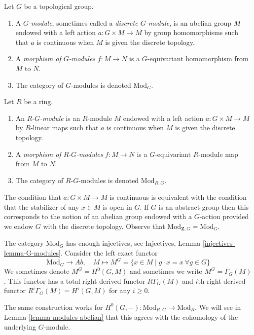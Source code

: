 \begin{definition}
\label{definition-G-module-continuous}
Let $G$ be a topological group.
\begin{enumerate}
\item A {\it $G$-module}, sometimes called a {\it discrete $G$-module},
is an abelian group $M$ endowed with a left action $a : G \times M \to M$
by group homomorphisms such that $a$ is continuous when $M$ is given the
discrete topology.
\item A {\it morphism of $G$-modules} $f : M \to N$ is a
$G$-equivariant homomorphism from $M$ to $N$.
\item The category of $G$-modules is denoted $\text{Mod}_G$.
\end{enumerate}
Let $R$ be a ring.
\begin{enumerate}
\item An {\it $R\text{-}G$-module} is an $R$-module $M$ endowed with
a left action $a : G \times M \to M$ by $R$-linear maps such that $a$
is continuous when $M$ is given the discrete topology.
\item A {\it morphism of $R\text{-}G$-modules} $f : M \to N$ is a
$G$-equivariant $R$-module map from $M$ to $N$.
\item The category of $R\text{-}G$-modules is denoted $\text{Mod}_{R, G}$.
\end{enumerate}
\end{definition}

\noindent
The condition that $a : G \times M \to M$ is continuous is equivalent
with the condition that the stabilizer of any $x \in M$ is open in $G$.
If $G$ is an abstract group then this corresponds to the notion of an
abelian group endowed with a $G$-action provided we endow $G$ with the
discrete topology. Observe that $\text{Mod}_{\mathbf{Z}, G} = \text{Mod}_G$.

\medskip\noindent
The category $\text{Mod}_G$ has enough injectives, see
Injectives, Lemma \ref{injectives-lemma-G-modules}.
Consider the left exact functor
$$
\text{Mod}_G \longrightarrow \textit{Ab},
\quad
M \longmapsto M^G =
\{x \in M \mid g \cdot x = x\ \forall g \in G\}
$$
We sometimes denote $M^G = H^0(G, M)$ and sometimes we write
$M^G = \Gamma_G(M)$. This functor has a total right derived functor
$R\Gamma_G(M)$ and $i$th right derived functor
$R^i\Gamma_G(M) = H^i(G, M)$ for any $i \geq 0$.

\medskip\noindent
The same construction works for
$H^0(G, -) : \text{Mod}_{R, G} \to \text{Mod}_R$. We will see in
Lemma \ref{lemma-modules-abelian} that this agrees with the cohomology
of the underlying $G$-module.

